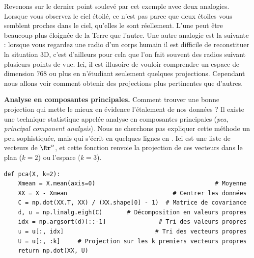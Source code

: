 \documentclass[11pt,class=report,crop=false]{standalone}
\begin{document}
Revenons sur le dernier point soulevé par cet exemple avec deux analogies.
Lorsque vous observez le ciel étoilé, ce n'est pas parce que deux étoiles vous semblent proches dans le ciel, qu'elles le sont réellement. L'une peut être beaucoup plus éloignée de la Terre que l'autre. 
Une autre analogie est la suivante : lorsque vous regardez une radio d'un corps humain il est difficile de reconstituer la situation 3D, c'est d'ailleurs pour cela que l'on fait souvent des radios suivant plusieurs points de vue. 
Ici, il est illusoire de vouloir comprendre un espace de dimension $768$ ou plus en n'étudiant seulement quelques projections.
Cependant nous allons voir comment obtenir des projections plus pertinentes que d'autres.


\bigskip


\textbf{Analyse en composantes principales.}
Comment trouver une bonne projection qui mette le mieux en évidence l'étalement de nos données ? Il existe une technique statistique appelée analyse en composantes principales (\emph{pca}, \emph{principal component analysis}). 
Nous ne cherchons pas expliquer cette méthode un peu sophistiquée, mais qui s'écrit en quelques lignes en \Python{}. Ici  est une liste  de vecteurs de $\Rr^n$, et cette fonction renvoie la projection de ces vecteurs dans le plan ($k=2$) ou l'espace ($k=3$).

\begin{center}
\begin{lstlisting}
def pca(X, k=2):
	Xmean = X.mean(axis=0)                                  # Moyenne
	XX = X - Xmean                              # Centrer les données	
	C = np.dot(XX.T, XX) / (XX.shape[0] - 1)  # Matrice de covariance	
	d, u = np.linalg.eigh(C)       # Décomposition en valeurs propres	
	idx = np.argsort(d)[::-1]               # Tri des valeurs propres	
	u = u[:, idx]                          # Tri des vecteurs propres	
	U = u[:, :k]     # Projection sur les k premiers vecteurs propres
	return np.dot(XX, U)
\end{lstlisting}
\end{center}
\end{document}
